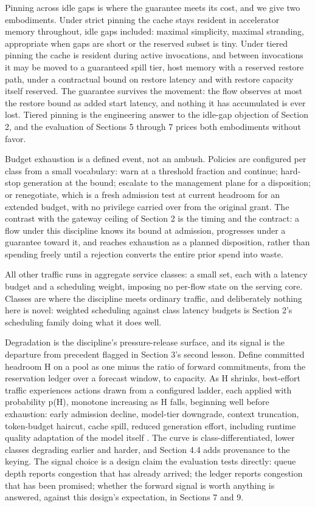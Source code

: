 Pinning across idle gaps is where the guarantee meets its cost, and we
give two embodiments. Under strict pinning the cache stays resident in
accelerator memory throughout, idle gaps included: maximal simplicity,
maximal stranding, appropriate when gaps are short or the reserved subset
is tiny. Under tiered pinning the cache is resident during active
invocations, and between invocations it may be moved to a guaranteed
spill tier, host memory with a reserved restore path, under a contractual
bound on restore latency and with restore capacity itself reserved. The
guarantee survives the movement: the flow observes at most the restore
bound as added start latency, and nothing it has accumulated is ever
lost. Tiered pinning is the engineering answer to the idle-gap objection
of Section 2, and the evaluation of Sections 5 through 7 prices both
embodiments without favor.

Budget exhaustion is a defined event, not an ambush. Policies are
configured per class from a small vocabulary: warn at a threshold
fraction and continue; hard-stop generation at the bound; escalate to the
management plane for a disposition; or renegotiate, which is a fresh
admission test at current headroom for an extended budget, with no
privilege carried over from the original grant. The contrast with the
gateway ceiling of Section 2 is the timing and the contract: a flow under
this discipline knows its bound at admission, progresses under a
guarantee toward it, and reaches exhaustion as a planned disposition,
rather than spending freely until a rejection converts the entire prior
spend into waste.

All other traffic runs in aggregate service classes: a small set, each
with a latency budget and a scheduling weight, imposing no per-flow state
on the serving core. Classes are where the discipline meets ordinary
traffic, and deliberately nothing here is novel: weighted scheduling
against class latency budgets is Section 2's scheduling family doing what
it does well.

Degradation is the discipline's pressure-release surface, and its signal
is the departure from precedent flagged in Section 3's second lesson.
Define committed headroom H on a pool as one minus the ratio of forward
commitments, from the reservation ledger over a forecast window, to
capacity. As H shrinks, best-effort traffic experiences actions drawn
from a configured ladder, each applied with probability p(H), monotone
increasing as H falls, beginning well before exhaustion: early admission
decline, model-tier downgrade, context truncation, token-budget haircut,
cache spill, reduced generation effort, including runtime quality
adaptation of the model itself \citep{morphserve2025}. The curve is
class-differentiated, lower classes degrading earlier and harder, and
Section 4.4 adds provenance to the keying. The signal choice is a design
claim the evaluation tests directly: queue depth reports congestion that
has already arrived; the ledger reports congestion that has been
promised; whether the forward signal is worth anything is answered,
against this design's expectation, in Sections 7 and 9.

